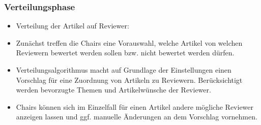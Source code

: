 \documentclass[headexclude,footexclude,12pt,BCOR0pt,DIV15]{scrartcl}
\begin{document}
        \subsubsection{Verteilungsphase}
        \begin{itemize}
            \item Verteilung der Artikel auf Reviewer:
            \item Zun\"{a}chst treffen die Chairs eine Vorauswahl, welche Artikel von welchen Reviewern bewertet
                werden sollen bzw. nicht bewertet werden d\"{u}rfen.
            \item Verteilungsalgorithmus macht auf Grundlage der Einstellungen einen Vorschlag f\"{u}r eine Zuordnung
                von Artikeln zu Reviewern. Ber\"{u}cksichtigt werden bevorzugte Themen und Artikelw\"{u}nsche der Reviewer.
            \item Chairs k\"{o}nnen sich im Einzelfall f\"{u}r einen Artikel andere m\"{o}gliche Reviewer anzeigen lassen und ggf.
                manuelle \"{A}nderungen an dem Vorschlag vornehmen.
        \end{itemize}
\end{document}
